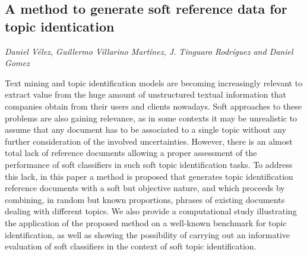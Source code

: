 \documentclass[../booklet.tex]{subfiles}
\begin{document}
\subsection[A method to generate soft reference data for topic identication. {\it Daniel Vélez, Guillermo Villarino Martínez, J. Tinguaro Rodríguez and Daniel Gomez}]{A method to generate soft reference data for topic identication}
   

\begin{center}
  {\it Daniel Vélez, Guillermo Villarino Martínez, J. Tinguaro Rodríguez and Daniel Gomez}
\end{center}

\vskip 0.8cm


Text mining and topic identification models are becoming increasingly relevant to extract value from the huge amount of unstructured textual information that companies obtain from their users and clients nowadays. Soft approaches to these problems are also gaining relevance, as in some contexts it may be unrealistic to assume that any document has to be associated to a single topic without any further consideration of the involved uncertainties. However, there is an almost total lack of reference documents allowing a proper assessment of the performance of soft classifiers in such soft topic identification tasks. To address this lack, in this paper a method is proposed that generates topic identification reference documents with a soft but objective nature, and which proceeds by combining, in random but known proportions, phrases of existing documents dealing with different topics. We also provide a computational study illustrating the application of the proposed method on a well-known benchmark for topic identification, as well as showing the possibility of carrying out an informative evaluation of soft classifiers in the context of soft topic identification.

\end{document}
